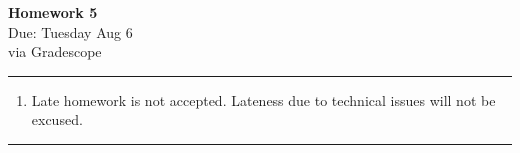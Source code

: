 \documentclass[12pt]{article}
\newif\ifshow
\begin{document}
\begin{center}
\ifshow
  \textbf{\Large Homework 2 Solution}\\
\else
  \textbf{\Large Homework 5}\\
\fi
Due: Tuesday Aug 6\\via Gradescope\\
\end{center}

\hrule

\vspace{0.2cm}

\begin{enumerate}[$\bullet$]  
\item Late homework is not accepted.  Lateness due to technical issues will not be excused.  
\end{enumerate}

\hrule

\vspace{0.5cm}
\end{document}
